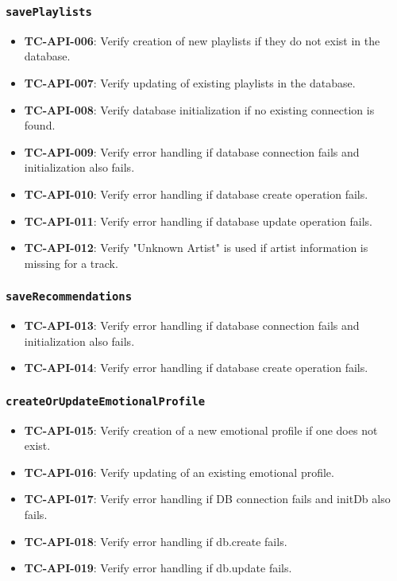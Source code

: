 \documentclass{article}
\begin{document}
\subsubsection{\texttt{savePlaylists}}
\begin{itemize}
    \item \textbf{TC-API-006}: Verify creation of new playlists if they do not exist in the database.
    \item \textbf{TC-API-007}: Verify updating of existing playlists in the database.
    \item \textbf{TC-API-008}: Verify database initialization if no existing connection is found.
    \item \textbf{TC-API-009}: Verify error handling if database connection fails and initialization also fails.
    \item \textbf{TC-API-010}: Verify error handling if database create operation fails.
    \item \textbf{TC-API-011}: Verify error handling if database update operation fails.
    \item \textbf{TC-API-012}: Verify "Unknown Artist" is used if artist information is missing for a track.
\end{itemize}

\subsubsection{\texttt{saveRecommendations}}
\begin{itemize}
    \item \textbf{TC-API-013}: Verify error handling if database connection fails and initialization also fails.
    \item \textbf{TC-API-014}: Verify error handling if database create operation fails.
\end{itemize}

\subsubsection{\texttt{createOrUpdateEmotionalProfile}}
\begin{itemize}
    \item \textbf{TC-API-015}: Verify creation of a new emotional profile if one does not exist.
    \item \textbf{TC-API-016}: Verify updating of an existing emotional profile.
    \item \textbf{TC-API-017}: Verify error handling if DB connection fails and initDb also fails.
    \item \textbf{TC-API-018}: Verify error handling if db.create fails.
    \item \textbf{TC-API-019}: Verify error handling if db.update fails.
\end{itemize}
\end{document}
